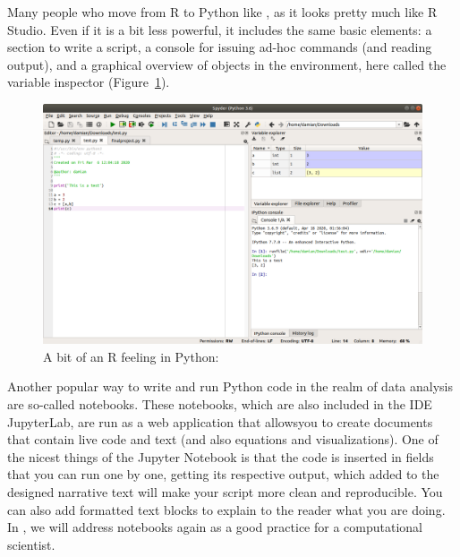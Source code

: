 Many people who move from R to Python like , as it
looks pretty much like R Studio. Even if it is a bit less powerful,
it includes the same basic elements: a section to write a script,
a console for issuing ad-hoc commands (and reading output), and
a graphical overview of objects in the environment, here called
the variable inspector (Figure~\ref{fig:python_spyder}). 

\begin{figure}
\centering
\includegraphics[width=0.9\linewidth]{figures/ch3-spyder}
\caption{A bit of an R feeling in Python: }
\label{fig:python_spyder}
\end{figure}

Another popular way to write and run Python code in the realm of data
analysis are so-called  notebooks. These notebooks, which
are also included in the IDE JupyterLab, are run as a web application
that allowsyou to create documents that contain live code and text
(and also equations and visualizations).  One of the nicest things of
the Jupyter Notebook is that the code is inserted in fields that you
can run one by one, getting its respective output, which added to the
designed narrative text will make your script more clean and
reproducible. You can also add formatted text blocks to explain to the
reader what you are doing. In , we will address
notebooks again as a good practice for a computational scientist.


